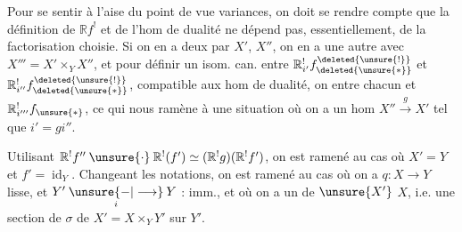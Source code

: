 Pour se sentir à l'aise du point de vue  variances, on doit se rendre compte que la définition de $\mathbb{R}f^!$ et de l'hom de dualité ne dépend pas, essentiellement, de la factorisation choisie.
Si on en a deux par $X'$, $X''$, on en a une autre avec $X'''=X'\times_Y X''$, et pour définir un isom. can. entre $\mathbb{R}^!_{i'}f^{\deleted{\unsure{!}}}_{\deleted{\unsure{*}}}$ et $\mathbb{R}^!_{i''}f^{\deleted{\unsure{!}}}_{\deleted{\unsure{*}}}$, compatible aux hom de dualité, on \uline{} entre   chacun et $\mathbb{R}^!_{i'''}f_{\unsure{*}}$, ce qui nous ramène à une situation où on a un hom  $X''\xrightarrow{g}X'$ tel que $i'=gi''$.



Utilisant $\mathbb{R}^!f''\mathbin{\unsure{\cdot}}\mathbb{R}^!(f')\simeq(\mathbb{R}^!g)(\mathbb{R}^!f')$, on est ramené au cas où $X'=Y$ et $f'=\operatorname{id}_Y$.
Changeant les notations, on est ramené au cas où on a $q:X\longrightarrow Y$ lisse, et $Y'\mathbin{\underset{i}{\unsure{-|\longrightarrow}}}Y$ : imm., et où on a un   de $\unsure{X'}$  $X$, i.e. une section de $\sigma$ de $X'=X\times_Y Y'$ sur $Y'$.

